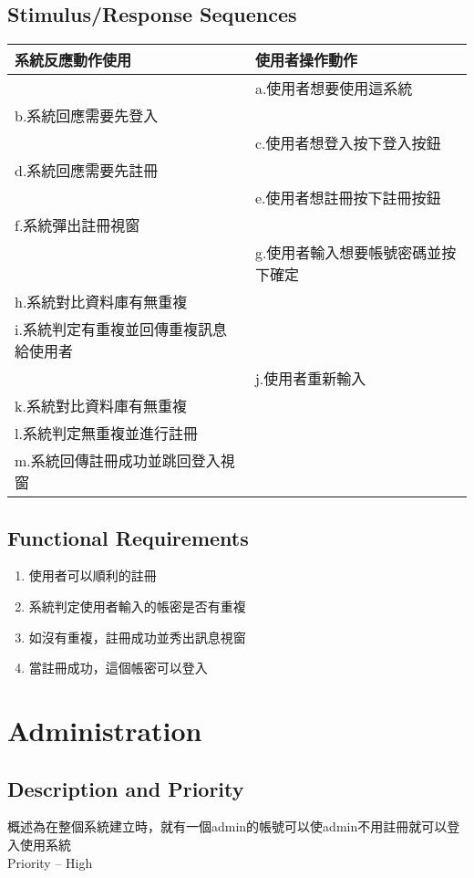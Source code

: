 \documentclass{scrreprt}
\begin{document}
\begin{CJK*}{UTF8}{bsmi}
\subsection{Stimulus/Response Sequences}
\begin{center}
\begin{tabular}{|l|l|}\hline
系統反應動作使用 & 使用者操作動作  \\ \hline
 & a.使用者想要使用這系統  \\ \hline
b.系統回應需要先登入 &   \\\hline
 & c.使用者想登入按下登入按鈕  \\\hline
d.系統回應需要先註冊&   \\\hline
 & e.使用者想註冊按下註冊按鈕  \\\hline
f.系統彈出註冊視窗&   \\\hline
 & g.使用者輸入想要帳號密碼並按下確定  \\\hline
h.系統對比資料庫有無重複&   \\\hline
i.系統判定有重複並回傳重複訊息給使用者&   \\\hline
 & j.使用者重新輸入  \\\hline
k.系統對比資料庫有無重複&   \\\hline
l.系統判定無重複並進行註冊&   \\\hline
m.系統回傳註冊成功並跳回登入視窗	&   \\\hline
\end{tabular}
\end{center}

\subsection{Functional Requirements}
\begin{enumerate}
\item 使用者可以順利的註冊
\item 系統判定使用者輸入的帳密是否有重複
\item 如沒有重複，註冊成功並秀出訊息視窗
\item 當註冊成功，這個帳密可以登入
\end{enumerate}
\section{Administration}
\subsection{Description and Priority}
概述為在整個系統建立時，就有一個admin的帳號可以使admin不用註冊就可以登入使用系統\\
Priority – High

\end{CJK*}
\end{document}
